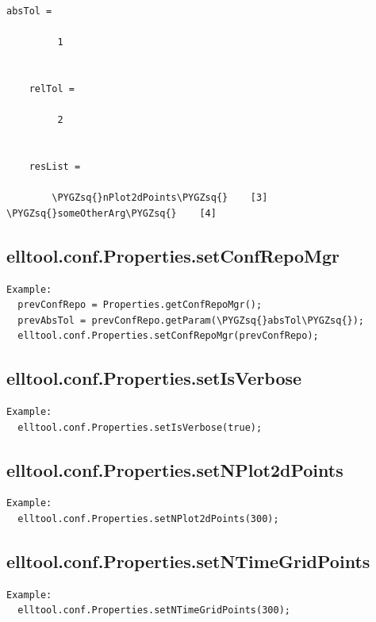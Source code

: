 \documentclass[letterpaper,10pt,english]{sphinxmanual}
\def\PYGZsq{\char`\'}
\begin{document}
\begin{Verbatim}[commandchars=\\\{\}]
    absTol =

         1


    relTol =

         2


    resList =

        \PYGZsq{}nPlot2dPoints\PYGZsq{}    [3]    \PYGZsq{}someOtherArg\PYGZsq{}    [4]
\end{Verbatim}


\subsection{elltool.conf.Properties.setConfRepoMgr}
\label{chap_functions:elltool-conf-properties-setconfrepomgr}
\begin{Verbatim}[commandchars=\\\{\}]
Example:
  prevConfRepo = Properties.getConfRepoMgr();
  prevAbsTol = prevConfRepo.getParam(\PYGZsq{}absTol\PYGZsq{});
  elltool.conf.Properties.setConfRepoMgr(prevConfRepo);
\end{Verbatim}


\subsection{elltool.conf.Properties.setIsVerbose}
\label{chap_functions:elltool-conf-properties-setisverbose}
\begin{Verbatim}[commandchars=\\\{\}]
Example:
  elltool.conf.Properties.setIsVerbose(true);
\end{Verbatim}


\subsection{elltool.conf.Properties.setNPlot2dPoints}
\label{chap_functions:elltool-conf-properties-setnplot2dpoints}
\begin{Verbatim}[commandchars=\\\{\}]
Example:
  elltool.conf.Properties.setNPlot2dPoints(300);
\end{Verbatim}


\subsection{elltool.conf.Properties.setNTimeGridPoints}
\label{chap_functions:elltool-conf-properties-setntimegridpoints}
\begin{Verbatim}[commandchars=\\\{\}]
Example:
  elltool.conf.Properties.setNTimeGridPoints(300);
\end{Verbatim}
\end{document}
